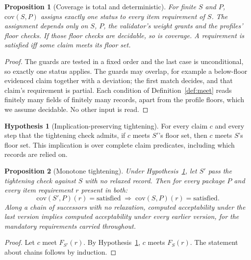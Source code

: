 \documentclass[11pt]{article}
\newtheorem{proposition}{Proposition}
\theoremstyle{definition}
\newtheorem{hypothesis}{Hypothesis}
\theoremstyle{remark}
\newcommand{\cov}{\mathrm{cov}}
\begin{document}
\begin{proposition}[Coverage is total and deterministic]\label{prop:total}
For finite $S$ and $P$, $\cov(S,P)$ assigns exactly one status to every item requirement of $S$.
The assignment depends only on $S$, $P$, the validator's weight grants and the profiles' floor
checks. If those floor checks are decidable, so is coverage. A requirement is satisfied iff some
claim meets its floor set.
\end{proposition}
\begin{proof}
The guards are tested in a fixed order and the last case is unconditional, so exactly one status
applies. The guards may overlap, for example a below-floor evidenced claim together with a
deviation; the first match decides, and that claim's requirement is partial. Each condition of
Definition~\ref{def:meet} reads finitely many fields of finitely many records, apart from the
profile floors, which we assume decidable. No other input is read.
\end{proof}

\begin{hypothesis}[Implication-preserving tightening]\label{hyp:comp}
For every claim $c$ and every step that the tightening check admits, if $c$ meets $S'$'s floor set,
then $c$ meets $S$'s floor set. This implication is over complete claim predicates, including which
records are relied on.
\end{hypothesis}

\begin{proposition}[Monotone tightening]\label{prop:mono}
Under Hypothesis~\ref{hyp:comp}, let $S'$ pass the tightening check against $S$ with no relaxed
record. Then for every package $P$ and every item requirement $r$ present in both:
\[
\cov(S',P)(r)=\text{satisfied}\;\Rightarrow\;\cov(S,P)(r)=\text{satisfied}.
\]
Along a chain of successors with no relaxation, computed acceptability under the last version
implies computed acceptability under every earlier version, for the mandatory requirements
carried throughout.
\end{proposition}
\begin{proof}
Let $c$ meet $F_{S'}(r)$. By Hypothesis~\ref{hyp:comp}, $c$ meets $F_S(r)$. The statement about
chains follows by induction.
\end{proof}
\end{document}
